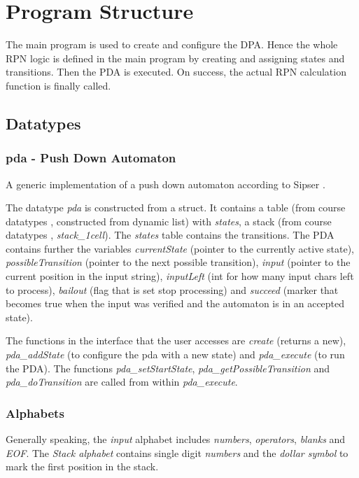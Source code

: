\documentclass[a4paper,11pt,twoside]{article}
\begin{document}
\section{Program Structure}
The main program is used to create and configure the DPA. Hence the
whole RPN logic is defined in the main program by creating and
assigning states and transitions. Then the PDA is executed. On
success, the actual RPN calculation function is finally called.

\subsection{Datatypes}

\subsubsection{pda - Push Down Automaton}
A generic implementation of a push down automaton according to Sipser
\cite[pp 112-125]{sipser2012}.

The datatype \textit{pda} is constructed from a struct. It contains a
table (from course datatypes \cite{datatypes}, constructed from
dynamic list) with \textit{states}, a stack (from course datatypes
\cite{datatypes}, \textit{stack\_1cell}). The \textit{states} table contains
the transitions. The PDA contains further the variables
\textit{currentState} (pointer to the currently active state),
\textit{possibleTransition} (pointer to the next possible transition),
\textit{input} (pointer to the current position in the input string), 
\textit{inputLeft} (int for how many input chars left to process),
\textit{bailout} (flag that is set stop processing) and
\textit{succeed} (marker that becomes true when the input was verified
and the automaton is in an accepted state).

The functions in the interface that the user accesses are \textit{create}
(returns a new), \textit{pda\_addState} (to configure the
pda with a new state) and \textit{pda\_execute} (to run the PDA). The
functions \textit{pda\_setStartState},
\textit{pda\_getPossibleTransition} and \textit{pda\_doTransition} are
called from within \textit{pda\_execute}. 


\subsubsection{Alphabets}
Generally speaking, the \textit{input} alphabet includes
\textit{numbers}, \textit{operators}, \textit{blanks} and
\textit{EOF}. The \textit{Stack alphabet} contains single digit
\textit{numbers} and the \textit{dollar symbol} to mark the first
position in the stack.   
\end{document}
